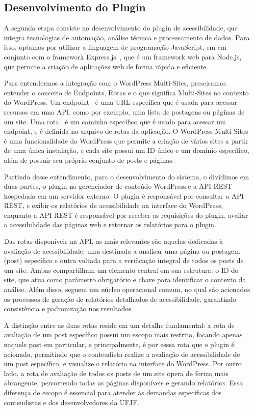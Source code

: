 \documentclass[
	article,			%
	12pt,				%
	oneside,			%
	a4paper,			%
	section=TITLE,		%
	subsection=TITLE,	%
	english,			%
	brazil,				%
	sumario=tradicional
	]{abntex2}
\begin{document}
\subsection{Desenvolvimento do Plugin}
A segunda etapa consiste no desenvolvimento do plugin de acessibilidade, que
integra tecnologias de automação, análise técnica e processamento de
dados. Para isso, optamos por utilizar a linguagem de programação JavaScript, em
em conjunto com o framework Express.js~\cite{express}, que é um framework web
para Node.js, que permite a criação de aplicações web de forma rápida
e eficiente.

Para entendermos a integração com o WordPress Multi-Sites, prescisamos entender
o conceito de Endpoints, Rotas e o que significa Multi-Sites no contexto do WordPress.
Um endpoint~\cite{endpoints} é uma URL específica que é usada para acessar
recursos em uma API, como por exemplo, uma lista de postagens ou páginas de um site. Uma
rota~\cite{routes} é um caminho específico que é usado para acessar um endpoint,
e é definida no arquivo de rotas da aplicação. O WordPress Multi-Sites é uma funcionalidade
do WordPress que permite a criação de vários sites a partir de uma única instalação,
e cada site possui um ID único e um domínio específico, além de possuir seu próprio
conjunto de posts e páginas.

Partindo desse entendimento, para o desenvolvimento do sistema, o
dividimos em duas partes, o plugin no gerenciador de conteúdo WordPress,e a
API REST hospedada em um servidor externo. O plugin é responsável por
consultar a API REST, e exibir os relatórios de acessibilidade na interface do
WordPress, enquanto a API REST é responsável por receber as requisições
do plugin, avaliar a acessibilidade das páginas web e retornar os relatórios
para o plugin.

Das rotas disponíveis na API, as mais relevantes são aquelas dedicadas
à avaliação de acessibilidade: uma destinada a analisar uma página ou postagem (post)
específico e outra voltada para a verificação integral de todos os posts de um
site. Ambas compartilham um elemento central em sua estrutura: o ID do
site, que atua como parâmetro obrigatório e chave para identificar o contexto
da análise. Além disso, seguem um núcleo operacional comum, no qual são
acionados os processos de geração de relatórios detalhados de acessibilidade,
garantindo consistência e padronização nos resultados.

A distinção entre as duas rotas reside em um detalhe fundamental: a rota
de avaliação de um post específico possui um escopo mais restrito, focando
apenas naquele post em particular, e principalmente, é por esssa rota que
o plugin é acionado, permitindo que o conteudista realize a avaliação de
acessibilidade de um post específico, e visualize o relatório na interface do
WordPress. Por outro lado, a rota de avaliação de todos os posts de um site
opera de forma mais abrangente, percorrendo todas as páginas disponíveis
e gerando relatórios. Essa diferença de escopo é essencial para atender às
demandas específicas dos conteudistas e dos desenvolvedores da UFJF.
\bigbreak
\end{document}
